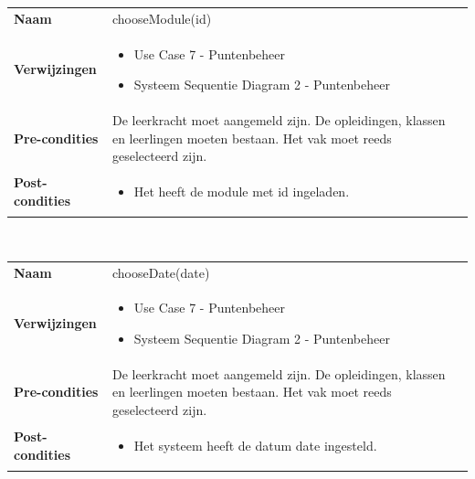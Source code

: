 \documentclass[a4paper]{article}
\begin{document}
\begin{tabularx}{\textwidth}{|l X|}
    \hline
    \textbf{Naam} & chooseModule(id) \\
    \textbf{Verwijzingen} & \begin{itemize}[leftmargin=*]
        \item Use Case 7 - Puntenbeheer
        \item Systeem Sequentie Diagram 2 - Puntenbeheer
    \end{itemize}\\
    \textbf{Pre-condities} & De leerkracht moet aangemeld zijn. De opleidingen, klassen en leerlingen moeten bestaan. Het vak moet reeds geselecteerd zijn.\\
    \textbf{Post-condities} & \begin{itemize}[leftmargin=*]
        \item Het heeft de module met id ingeladen.
    \end{itemize}\\
    \hline
\end{tabularx}\\

\begin{tabularx}{\textwidth}{|l X|}
    \hline
    \textbf{Naam} & chooseDate(date) \\
    \textbf{Verwijzingen} & \begin{itemize}[leftmargin=*]
        \item Use Case 7 - Puntenbeheer
        \item Systeem Sequentie Diagram 2 - Puntenbeheer
    \end{itemize}\\
    \textbf{Pre-condities} & De leerkracht moet aangemeld zijn. De opleidingen, klassen en leerlingen moeten bestaan. Het vak moet reeds geselecteerd zijn.\\
    \textbf{Post-condities} & \begin{itemize}[leftmargin=*]
        \item Het systeem heeft de datum date ingesteld.
    \end{itemize}\\
    \hline
\end{tabularx}\\
\end{document}

